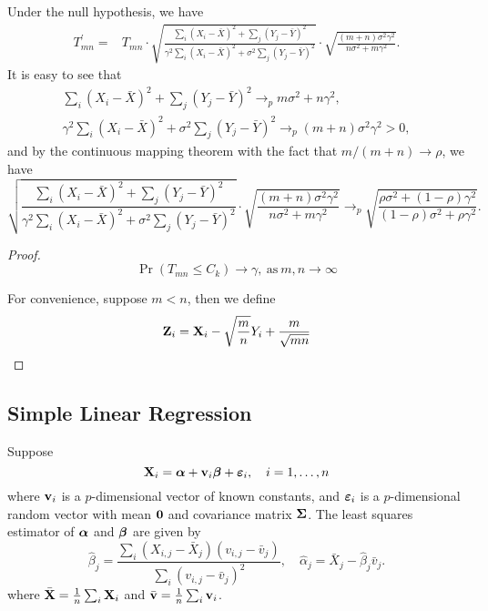 Under the null hypothesis, we have
\begin{equation*}
	\begin{aligned}
		T_{mn}^{\prime}= & T_{mn}\cdot\sqrt{\frac{\sum_{i}\left(X_i-\bar{X}\right)^2+\sum_{j}\left(Y_j-\bar{Y}\right)^2}{\gamma^{2}\sum_{i}\left(X_i-\bar{X}\right)^2+\sigma^{2}\sum_{j}\left(Y_j-\bar{Y}\right)^2}}\cdot\sqrt{\frac{(m+n)\sigma^{2}\gamma^{2}}{n\sigma^{2}+m\gamma^{2}}}.
	\end{aligned}
\end{equation*}
It is easy to see that
\begin{gather*}
	\sum_{i}\left(X_i-\bar{X}\right)^2+\sum_{j}\left(Y_j-\bar{Y}\right)^2\rightarrow_{p} m\sigma^{2}+n\gamma^{2},\\
	\gamma^{2}\sum_{i}\left(X_i-\bar{X}\right)^2+\sigma^{2}\sum_{j}\left(Y_j-\bar{Y}\right)^2\rightarrow_{p} (m+n)\sigma^{2}\gamma^{2}>0,
\end{gather*}
and by the continuous mapping theorem with the fact that $m/(m+n)\rightarrow\rho$, we have
\begin{equation*}
	\sqrt{\frac{\sum_{i}\left(X_i-\bar{X}\right)^2+\sum_{j}\left(Y_j-\bar{Y}\right)^2}{\gamma^{2}\sum_{i}\left(X_i-\bar{X}\right)^2+\sigma^{2}\sum_{j}\left(Y_j-\bar{Y}\right)^2}}\cdot\sqrt{\frac{(m+n)\sigma^{2}\gamma^{2}}{n\sigma^{2}+m\gamma^{2}}}\rightarrow_{p}\sqrt{\frac{\rho\sigma^{2}+(1-\rho)\gamma^{2}}{(1-\rho)\sigma^{2}+\rho\gamma^{2}}}.
\end{equation*}

\begin{proof}
	\begin{equation*}
		\Pr\left(T_{mn}\leq C_{k}\right)\rightarrow\gamma,\ \text{as}\ m,n\rightarrow\infty
	\end{equation*}

	For convenience, suppose $m<n$, then we define
	\begin{equation*}
		{\bf Z}_{i}={\bf X}_{i}-\sqrt{\frac{m}{n}}Y_{i}+\frac{m}{\sqrt{mn}}
	\end{equation*}
\end{proof}

\subsection{Simple Linear Regression}

Suppose
\begin{equation*}
	{\bf X}_{i}=\boldsymbol{\alpha}+{\bf v}_{i}\boldsymbol{\beta}+\boldsymbol{\varepsilon}_{i},\quad i=1,\ldots,n
\end{equation*}
where ${\bf v}_{i}$ is a $p$-dimensional vector of known constants, and $\boldsymbol{\varepsilon}_{i}$ is a $p$-dimensional random vector with mean $\mathbf{0}$ and covariance matrix $\boldsymbol{\Sigma}$. The least squares estimator of $\boldsymbol{\alpha}$ and $\boldsymbol{\beta}$ are given by
\begin{equation*}
	\hat{\beta}_{j}=\frac{\sum_{i}(X_{i,j}-\bar{X}_{j})(v_{i,j}-\bar{v}_{j})}{\sum_{i}(v_{i,j}-\bar{v}_{j})^{2}},\quad\hat{\alpha}_{j}=\bar{X}_{j}-\hat{\beta}_{j}\bar{v}_{j}.
\end{equation*}
where $\bar{{\bf X}}=\frac{1}{n}\sum_{i}{\bf X}_{i}$ and $\bar{{\bf v}}=\frac{1}{n}\sum_{i}{\bf v}_{i}$.


